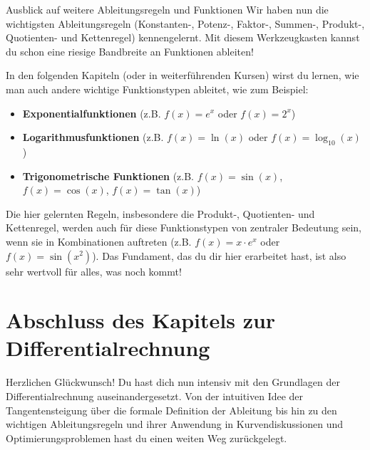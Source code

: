


\begin{infoboxumgebung}{Ausblick auf weitere Ableitungsregeln und Funktionen}
Wir haben nun die wichtigsten Ableitungsregeln (Konstanten-, Potenz-, Faktor-, Summen-, Produkt-, Quotienten- und Kettenregel) kennengelernt. Mit diesem Werkzeugkasten kannst du schon eine riesige Bandbreite an Funktionen ableiten!

In den folgenden Kapiteln (oder in weiterführenden Kursen) wirst du lernen, wie man auch andere wichtige Funktionstypen ableitet, wie zum Beispiel:
\begin{itemize}
    \item \textbf{Exponentialfunktionen} (z.B. $f(x) = e^x$ oder $f(x) = 2^x$)
    \item \textbf{Logarithmusfunktionen} (z.B. $f(x) = \ln(x)$ oder $f(x) = \log_{10}(x)$)
    \item \textbf{Trigonometrische Funktionen} (z.B. $f(x) = \sin(x)$, $f(x) = \cos(x)$, $f(x) = \tan(x)$)
\end{itemize}
Die hier gelernten Regeln, insbesondere die Produkt-, Quotienten- und Kettenregel, werden auch für diese Funktionstypen von zentraler Bedeutung sein, wenn sie in Kombinationen auftreten (z.B. $f(x) = x \cdot e^x$ oder $f(x) = \sin(x^2)$).
Das Fundament, das du dir hier erarbeitet hast, ist also sehr wertvoll für alles, was noch kommt!
\end{infoboxumgebung}



\section*{Abschluss des Kapitels zur Differentialrechnung}

Herzlichen Glückwunsch! Du hast dich nun intensiv mit den Grundlagen der Differentialrechnung auseinandergesetzt. Von der intuitiven Idee der Tangentensteigung über die formale Definition der Ableitung bis hin zu den wichtigen Ableitungsregeln und ihrer Anwendung in Kurvendiskussionen und Optimierungsproblemen hast du einen weiten Weg zurückgelegt.

